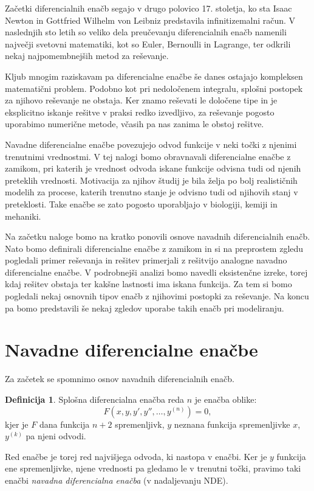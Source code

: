 \documentclass[12pt,a4paper]{amsart}
\theoremstyle{definition} %
\newtheorem{definicija}{Definicija}[section]
\theoremstyle{plain} %
\begin{document}
Začetki diferencialnih enačb segajo v drugo polovico 17. stoletja, ko sta Isaac Newton in Gottfried Wilhelm von 
Leibniz predstavila infinitizemalni račun. V naslednjih sto letih so veliko dela preučevanju diferencialnih
enačb namenili največji svetovni matematiki, kot so Euler, Bernoulli in Lagrange, ter odkrili nekaj najpomembnejših
metod za reševanje.

Kljub mnogim raziskavam pa diferencialne enačbe še danes ostajajo kompleksen matematični problem. Podobno kot pri
nedoločenem integralu, splošni postopek za njihovo reševanje ne obstaja. Ker znamo reševati le določene tipe in je
eksplicitno iskanje rešitve v praksi redko izvedljivo, za reševanje pogosto uporabimo numerične metode,
včasih pa nas zanima le obstoj rešitve.

Navadne diferencialne enačbe povezujejo odvod funkcije v neki točki z njenimi trenutnimi vrednostmi.
V tej nalogi bomo obravnavali diferencialne enačbe z zamikom, pri katerih je vrednost odvoda iskane funkcije odvisna
tudi od njenih preteklih vrednosti. Motivacija za njihov študij je bila želja po bolj realističnih modelih za procese, 
katerih trenutno stanje je odvisno tudi od njihovih stanj v preteklosti. Take enačbe se zato pogosto uporabljajo
v biologiji, kemiji in mehaniki.

Na začetku naloge bomo na kratko ponovili osnove navadnih diferencialnih enačb. Nato bomo definirali
diferencialne enačbe z zamikom in si na preprostem zgledu pogledali primer reševanja in rešitev primerjali z 
rešitvijo analogne navadno diferencialne enačbe. V podrobnejši analizi bomo navedli eksistenčne izreke, torej kdaj 
rešitev obstaja ter kakšne lastnosti ima iskana funkcija. Za tem si bomo pogledali nekaj osnovnih tipov enačb z 
njihovimi postopki za reševanje. Na koncu pa bomo predstavili še nekaj zgledov uporabe takih enačb pri modeliranju.


\newpage

\section{Navadne diferencialne enačbe}

Za začetek se spomnimo osnov navadnih diferencialnih enačb.

\begin{definicija}
    Splošna diferencialna enačba reda $n$ je enačba oblike:
    \[F(x,y,y',y'',\dots,y^{(n)})=0,\]
    kjer je $F$ dana funkcija $n+2$ spremenljivk, $y$ neznana funkcija spremenljivke $x$, $y^{(k)}$ pa njeni
    odvodi.
\end{definicija}
Red enačbe je torej red najvišjega odvoda, ki nastopa v enačbi. Ker je $y$ funkcija ene spremenljivke,
njene vrednosti pa gledamo le v trenutni točki, pravimo taki enačbi \emph{navadna diferencialna enačba} (v
nadaljevanju NDE).
\end{document}
